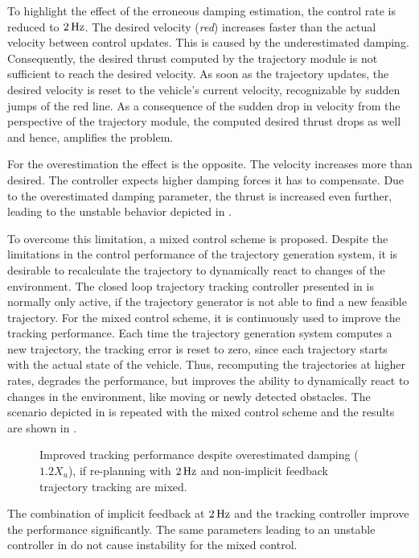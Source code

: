 To highlight the effect of the erroneous damping estimation, the control rate is reduced to $\unit[2]{Hz}$. The desired velocity (\emph{red}) increases faster than the actual velocity between control updates.
This is caused by the underestimated damping. Consequently, the desired thrust computed by the trajectory module is not sufficient to reach the desired velocity.
As soon as the trajectory updates, the desired velocity is reset to the vehicle's current velocity, recognizable by sudden jumps of the red line.
As a consequence of the sudden drop in velocity from the perspective of the trajectory module, the computed desired thrust drops as well and hence, amplifies the problem.

For the overestimation the effect is the opposite. The velocity increases more than desired.
The controller expects higher damping forces it has to compensate.
Due to the overestimated damping parameter, the thrust is increased even further, leading to the unstable behavior depicted in .

To overcome this limitation, a mixed control scheme is proposed. Despite the limitations in the control performance of the trajectory generation system, it is desirable to recalculate the trajectory to dynamically react to changes of the environment.
The closed loop trajectory tracking controller presented in  is normally only active, if the trajectory generator is not able to find a new feasible trajectory. For the mixed control scheme, it is continuously used to improve the tracking performance. Each time the trajectory generation system computes a new trajectory, the tracking error is reset to zero, since each trajectory starts with the actual state of the vehicle. Thus, recomputing the trajectories at higher rates, degrades the performance, but improves the ability to dynamically react to changes in the environment, like moving or newly detected obstacles. The scenario depicted in  is repeated with the mixed control scheme and the results are shown in .
\begin{figure}
	\centering
	
	\caption{Improved tracking performance despite overestimated damping ($1.2 X_u$), if re-planning with $\unit[2]{Hz}$ and non-implicit feedback trajectory tracking are mixed.}
    \label{fig:improved-performance-mixed-control}
\end{figure}
The combination of implicit feedback at $\unit[2]{Hz}$ and the tracking controller improve the performance significantly. The same parameters leading to an unstable controller in  do not cause instability for the mixed control.

